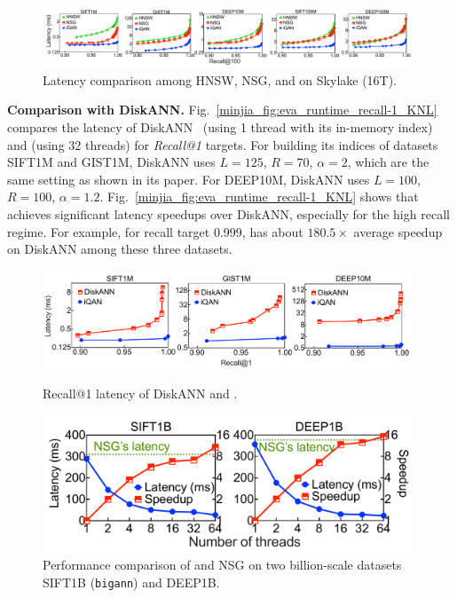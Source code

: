 \begin{figure}
    \centering
    \includegraphics[width=0.98\textwidth]{submissions/Minjia2023/figures/eva_runtime_Skylake}
    \caption[Study of Latency]{Latency comparison among HNSW, NSG, and \Hammer on  Skylake (16T).}
    \label{minjia_fig:eval-latency}
\end{figure}

\textbf{Comparison with DiskANN.} Fig.~\ref{minjia_fig:eva_runtime_recall-1_KNL} compares the latency of DiskANN~\cite{subramanya32diskann} (using 1 thread with its in-memory index) and \Hammer (using 32 threads) for \emph{Recall@1} targets. 
For building its indices of datasets SIFT1M and GIST1M, DiskANN uses $L=125$, $R=70$, $\alpha = 2$, which are the same setting as shown in its paper. For DEEP10M, DiskANN uses $L=100$, $R=100$, $\alpha=1.2$. 
Fig.~\ref{minjia_fig:eva_runtime_recall-1_KNL} shows that \Hammer achieves significant latency speedups over DiskANN, especially for the high recall regime. For example, for recall target 0.999, \Hammer has about $180.5\times$ average speedup on DiskANN among these three datasets.

\begin{figure}[t]
\begin{minipage}[t]{0.55\textwidth}
    \centering
    \includegraphics[width=0.98\textwidth]{submissions/Minjia2023/figures/eva_runtime_recall-1_KNL}
    \caption[Recall@1 Latency]{Recall@1 latency of DiskANN and \Hammer.
    }
    \label{minjia_fig:eva_runtime_recall-1_KNL}
\end{minipage}
\hfill
\begin{minipage}[t]{0.42\textwidth}
    \centering
    \includegraphics[width=0.98\textwidth]{submissions/Minjia2023/figures/eva_sift1b_deep1b_latency}
    \caption[Latency for 1B datasets]{Performance comparison of \Hammer and NSG on two billion-scale datasets SIFT1B (\texttt{bigann}) and DEEP1B. 
        }
    \label{minjia_fig:eva_sift1b_deep1b_latency}
\end{minipage}
\end{figure}



